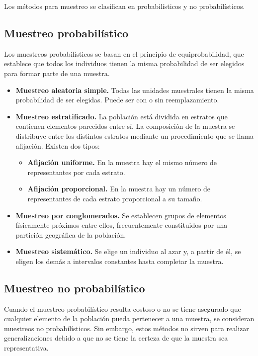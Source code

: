 Los métodos para muestreo se clasifican en probabilísticos y no probabilísticos.

\subsection{Muestreo probabilístico}
Los muestreos probabilísticos se basan en el principio de equiprobabilidad, que establece que todos los individuos tienen la misma probabilidad de ser elegidos para formar parte de una muestra.
\begin{itemize}
    \item \textbf{Muestreo aleatoria simple.}
    Todas las unidades muestrales tienen la misma probabilidad de ser elegidas.
    Puede ser con o sin reemplazamiento.

    \item \textbf{Muestreo estratificado.}
    La población está dividida en estratos que contienen elementos parecidos entre sí.
    La composición de la muestra se distribuye entre los distintos estratos mediante un procedimiento que se llama afijación.
    Existen dos tipos:
    \begin{itemize}
        \item \textbf{Afijación uniforme.}
        En la muestra hay el mismo número de representantes por cada estrato.
        \item \textbf{Afijación proporcional.}
        En la muestra hay un número de representantes de cada estrato proporcional a su tamaño.
    \end{itemize}

    \item \textbf{Muestreo por conglomerados.}
    Se establecen grupos de elementos físicamente próximos entre ellos, frecuentemente constituidos por una partición geográfica de la población.

    \item \textbf{Muestreo sistemático.}
    Se elige un individuo al azar y, a partir de él, se eligen los demás a intervalos constantes hasta completar la muestra.
\end{itemize}

\subsection{Muestreo no probabilístico}
Cuando el muestreo probabilístico resulta costoso o no se tiene asegurado que cualquier elemento de la población pueda pertenecer a una muestra, se consideran muestreos no probabilísticos.
Sin embargo, estos métodos no sirven para realizar generalizaciones debido a que no se tiene la certeza de que la muestra sea representativa.

